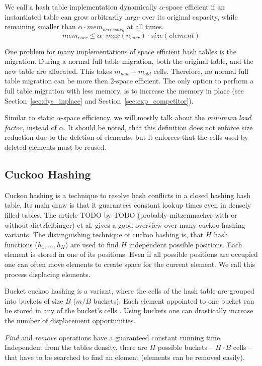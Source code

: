 \documentclass[a4paper,UKenglish]{lipics-v2016}
\begin{document}
We call a hash table implementation dynamically $\alpha$-space
efficient if an instantiated table can grow arbitrarily large over its
original capacity, while remaining smaller than $\alpha\cdot
mem_{necessary}$ at all times.
\[mem_{curr} \leq \alpha\cdot max(n_{curr})\cdot size(element)\]

One problem for many implementations of space efficient hash tables is
the migration.  During a normal full table migration, both the
original table, and the new table are allocated.  This takes
$\textit{m}_{\textit{new}} + \textit{m}_{\textit{old}}$
cells. Therefore, no normal full table migration can be more then
2-space efficient.  The only option to perform a full table migration
with less memory, is to increase the memory in place (see
Section~\ref{sec:dys_inplace} and
Section~\ref{sec:exp_competitor}).

Similar to static $\alpha$-space efficiency, we will mostly talk about
the \emph{minimum load factor}, instead of $\alpha$.  It should be
noted, that this definition does not enforce size reduction due to the
deletion of elements, but it enforces that the cells used by deleted
elements must be reused.

\subsection{Cuckoo Hashing}
Cuckoo hashing is a technique to resolve hash conflicts in a closed
hashing hash table. Its main draw is that it guarantees constant
lookup times even in densely filled tables. The article TODO by TODO
(probably mitzenmacher with or without dietzfelbinger) et al. gives a
good overview over many cuckoo hashing variants.  The distinguishing
technique of cuckoo hashing is, that $H$ hash functions ($h_1, ... ,
h_H$) are used to find $H$ independent possible positions. Each
element is stored in one of its positions.  Even if all possible
positions are occupied one can often move elements to create space for
the current element. We call this process displacing elements.

Bucket cuckoo hashing is a variant, where the cells of the hash table
are grouped into buckets of size $B$ ($m/B$ buckets).  Each element
appointed to one bucket can be stored in any of the bucket's cells .
Using buckets one can drastically increase the number of displacement
opportunities.

\emph{Find} and \emph{remove} operations have a guaranteed constant
running time. Independent from the tables density, there are $H$
possible buckets -- $H\cdot B$ cells -- that have to be searched to
find an element (elements can be removed easily).
\end{document}
